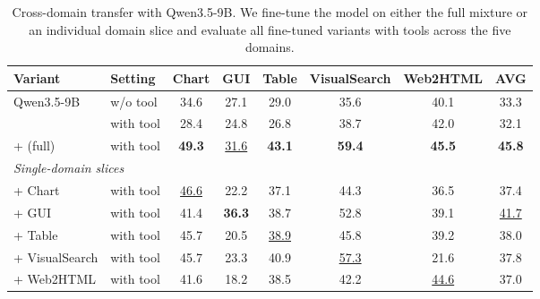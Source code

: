 \begin{table}[t]
\centering
\small

\begin{tabular}{llcccccc}
\toprule
\textbf{Variant} & \textbf{Setting} & \textbf{Chart} & \textbf{GUI} & \textbf{Table} & \textbf{VisualSearch} & \textbf{Web2HTML} & \textbf{AVG} \\
\midrule
\multirow{2}{*}{Qwen3.5-9B} & w/o tool & 34.6 & 27.1 & 29.0 & 35.6 & 40.1 & 33.3 \\
 & with tool & 28.4 & 24.8 & 26.8 & 38.7 & 42.0 & 32.1 \\
\midrule
+ \dataset{} (full) & with tool & \textbf{49.3} & \underline{31.6} & \textbf{43.1} & \textbf{59.4} & \textbf{45.5} & \textbf{45.8} \\
\midrule
\multicolumn{8}{l}{\textit{Single-domain slices}} \\
\quad + Chart & with tool & \underline{46.6} & 22.2 & 37.1 & 44.3 & 36.5 & 37.4 \\
\quad + GUI & with tool & 41.4 & \textbf{36.3} & 38.7 & 52.8 & 39.1 & \underline{41.7} \\
\quad + Table & with tool & 45.7 & 20.5 & \underline{38.9} & 45.8 & 39.2 & 38.0 \\
\quad + VisualSearch & with tool & 45.7 & 23.3 & 40.9 & \underline{57.3} & 21.6 & 37.8 \\
\quad + Web2HTML & with tool & 41.6 & 18.2 & 38.5 & 42.2 & \underline{44.6} & 37.0 \\
\bottomrule
\end{tabular}

\caption{Cross-domain transfer with Qwen3.5-9B. We fine-tune the model on either the full \dataset{} mixture or an individual domain slice and evaluate all fine-tuned variants with tools across the five domains.}
\label{tab:cross}

\end{table}
